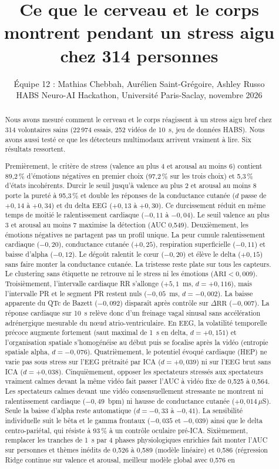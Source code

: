 \documentclass[10pt]{article}
\title{Ce que le cerveau et le corps montrent pendant un stress aigu chez 314 personnes}
\author{Équipe 12 : Mathias Chebbah, Aurélien Saint-Grégoire, Ashley Russo\\
\small HABS Neuro-AI Hackathon, Université Paris-Saclay, novembre 2026}
\date{}
\begin{document}
\maketitle

\begin{abstract}
\noindent Nous avons mesuré comment le cerveau et le corps réagissent à un stress aigu bref chez 314 volontaires sains (22\,974 essais, 252 vidéos de 10~s, jeu de données HABS). Nous avons aussi testé ce que les détecteurs multimodaux arrivent vraiment à lire. Six résultats ressortent.

Premièrement, le critère de stress (valence au plus 4 et arousal au moins 6) contient 89,2\,\% d'émotions négatives en premier choix (97,2\,\% sur les trois choix) et 5,3\,\% d'états incohérents. Durcir le seuil jusqu'à valence au plus 2 et arousal au moins 8 porte la pureté à 95,3\,\% et double les réponses de la conductance cutanée ($d$ passe de $+0{,}14$ à $+0{,}34$) et du delta EEG ($+0{,}13$ à $+0{,}30$). Ce durcissement réduit en même temps de moitié le ralentissement cardiaque ($-0{,}11$ à $-0{,}04$). Le seuil valence au plus 3 et arousal au moins 7 maximise la détection (AUC 0,549). Deuxièmement, les émotions négatives ne partagent pas un profil unique. La peur cumule ralentissement cardiaque ($-0{,}20$), conductance cutanée ($+0{,}25$), respiration superficielle ($-0{,}11$) et baisse d'alpha ($-0{,}12$). Le dégoût ralentit le cœur ($-0{,}20$) et élève le delta ($+0{,}15$) sans faire monter la conductance cutanée. La tristesse reste plate sur tous les capteurs. Le clustering sans étiquette ne retrouve ni le stress ni les émotions ($\mathrm{ARI} < 0{,}009$). Troisièmement, l'intervalle cardiaque RR s'allonge ($+5{,}1$~ms, $d = +0{,}116$), mais l'intervalle PR et le segment PR restent nuls ($-0{,}05$~ms, $d = -0{,}002$). La baisse apparente du QTc de Bazett ($-0{,}092$) disparaît après contrôle sur $\Delta\mathrm{RR}$ ($-0{,}007$). La réponse cardiaque sur 10~s relève donc d'un freinage vagal sinusal sans accélération adrénergique mesurable du nœud atrio-ventriculaire. En EEG, la volatilité temporelle précoce augmente fortement (saut maximal de 1~s en delta, $d = +0{,}151$) et l'organisation spatiale s'homogénéise au début puis se focalise après la vidéo (entropie spatiale alpha, $d = -0{,}076$). Quatrièmement, le potentiel évoqué cardiaque (HEP) ne varie pas sous stress sur l'EEG prétraité par ICA ($d = +0{,}039$) ni sur l'EEG brut sans ICA ($d = +0{,}038$). Cinquièmement, opposer les spectateurs stressés aux spectateurs vraiment calmes devant la même vidéo fait passer l'AUC à vidéo fixe de 0,525 à 0,564. Les spectateurs calmes devant une vidéo consensuellement stressante ne montrent ni ralentissement cardiaque ($-0{,}49$~bpm) ni hausse de conductance cutanée ($+0{,}014\,\mu$S). Seule la baisse d'alpha reste automatique ($d = -0{,}33$ à $-0{,}41$). La sensibilité individuelle suit le bêta et le gamma frontaux ($-0{,}035$ et $-0{,}039$) ainsi que le delta centro-pariétal, qui résiste à 93\,\% à un contrôle oculaire pré-ICA. Sixièmement, remplacer les tranches de 1~s par 4 phases physiologiques enrichies fait monter l'AUC sur personnes et thèmes inédits de 0,526 à 0,589 (modèle linéaire) et 0,586 (régression Ridge continue sur valence et arousal, meilleur modèle global avec 0,576 en 
\end{abstract}
\end{document}

